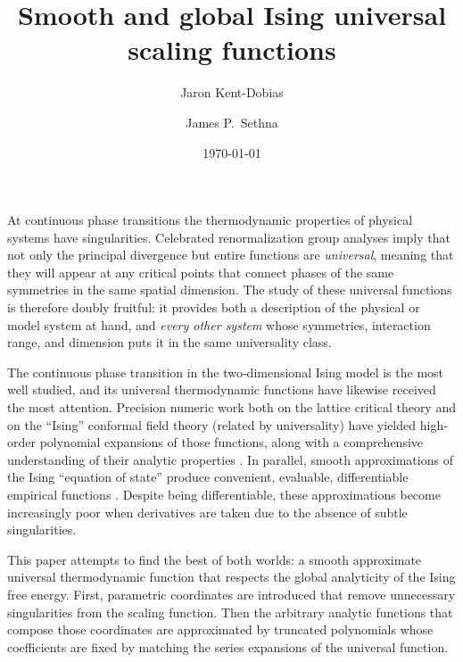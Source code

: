 \documentclass[
  aps,
  pre,
  preprint,
  longbibliography,
  floatfix
]{revtex4-2}
\begin{document}
\title{Smooth and global Ising universal scaling functions}

\author{Jaron Kent-Dobias}

\author{James P.~Sethna}

\date\today

\begin{abstract}
\end{abstract}

\maketitle

At continuous phase transitions the thermodynamic properties of physical
systems have singularities. Celebrated renormalization group analyses imply
that not only the principal divergence but entire functions are
\emph{universal}, meaning that they will appear at any critical points that
connect phases of the same symmetries in the same spatial dimension. The study
of these universal functions is therefore doubly fruitful: it provides both a
description of the physical or model system at hand, and \emph{every other
system} whose symmetries, interaction range, and dimension puts it in the same
universality class.

The continuous phase transition in the two-dimensional Ising model is the most
well studied, and its universal thermodynamic functions have likewise received
the most attention. Precision numeric work both on the lattice critical theory
and on the ``Ising'' conformal field theory (related by universality) have
yielded high-order polynomial expansions of those functions, along with a
comprehensive understanding of their analytic properties
\cite{Fonseca_2003_Ising, Mangazeev_2008_Variational, Mangazeev_2010_Scaling}.
In parallel, smooth approximations of the Ising ``equation of state'' produce
convenient, evaluable, differentiable empirical functions
\cite{Caselle_2001_The}. Despite being differentiable, these approximations
become increasingly poor when derivatives are taken due to the absence of
subtle singularities.

This paper attempts to find the best of both worlds: a smooth approximate
universal thermodynamic function that respects the global analyticity of the
Ising free energy. First, parametric coordinates are introduced that remove unnecessary
singularities from the scaling function. Then the arbitrary analytic
functions that compose those coordinates are approximated by truncated
polynomials whose coefficients are fixed by matching the series expansions of
the universal function.
\end{document}
